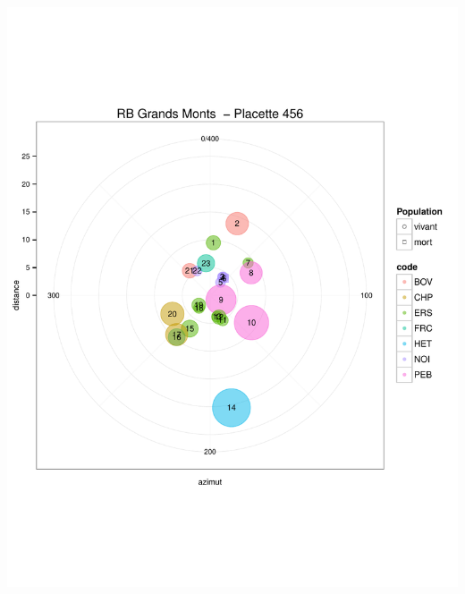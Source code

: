 \documentclass[a4paper]{book}\usepackage[]{graphicx}\usepackage[]{color}
\makeatletter
\def\maxwidth{ %
  \ifdim\Gin@nat@width>\linewidth
    \linewidth
  \else
    \Gin@nat@width
  \fi
}
\newenvironment{knitrout}{}{} %
\makeatother
\begin{document}
\begin{knitrout}
{\centering \includegraphics[width=\maxwidth]{Figures/PlanArbres-49} 

}





\end{knitrout}
\end{document}
